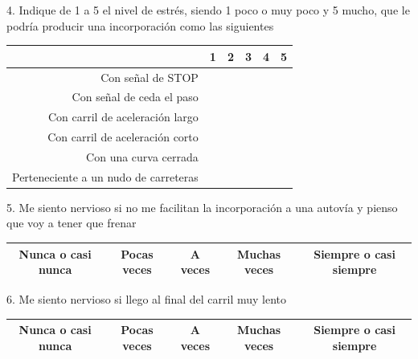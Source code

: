 4. Indique de 1 a 5 el nivel de estrés, siendo 1 poco o muy poco y 5 mucho, que le podría producir una incorporación como las siguientes 
\newpage
\vspace{-10pt}
\begin{table}[]
\centering
\begin{tabular}{|r|l|l|l|l|l|}
\hline
\textit{}                             & \textbf{1} & \textbf{2} & \textbf{3} & \textbf{4} & \textbf{5} \\ \hline
Con señal de STOP                     & \textit{}  & \textit{}  & \textit{}  & \textit{}  & \textit{}  \\ \hline
Con señal de ceda el paso             &            &            &            &            &            \\ \hline
Con carril de aceleración largo       &            &            &            &            &            \\ \hline
Con carril de aceleración corto       &            &            &            &            &            \\ \hline
Con una curva cerrada                 &            &            &            &            &            \\ \hline
Perteneciente a un nudo de carreteras &            &            &            &            &            \\ \hline
\end{tabular}
\end{table}

5. Me siento nervioso si no me facilitan la incorporación a una autovía y pienso que voy a tener que frenar 
\vspace{-10pt}
\begin{table}[h]
\centering
\begin{tabular}{|c|c|c|c|c|}
\hline
Nunca o casi nunca & Pocas veces & A veces & Muchas veces & Siempre o casi siempre \\ \hline
\end{tabular}
\end{table}

6. Me siento nervioso si llego al final del carril muy lento 
\vspace{-10pt}
\begin{table}[h]
\centering
\begin{tabular}{|c|c|c|c|c|}
\hline
Nunca o casi nunca & Pocas veces & A veces & Muchas veces & Siempre o casi siempre \\ \hline
\end{tabular}
\end{table}

